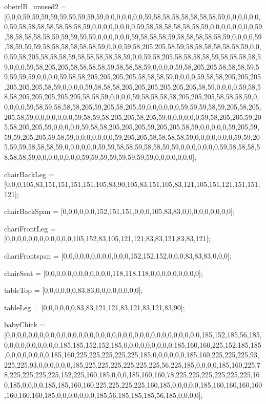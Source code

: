 obetrlB_unused2 = [0,0,0,59,59,59,59,59,59,59,59,59,0,0,0,0,0,0,0,59,58,58,58,58,58,58,58,59,0,0,0,0,0,0,0,59,58,58,58,58,58,58,58,59,0,0,0,0,0,0,0,0,59,58,58,58,58,58,58,59,0,0,0,0,0,0,0,0,59,58,58,58,58,58,59,59,59,59,59,0,0,0,0,0,0,59,58,58,58,59,58,58,58,58,58,59,0,0,0,0,59,58,59,59,59,58,58,58,58,58,58,59,0,0,0,59,58,205,205,58,59,58,58,58,58,58,58,59,0,0,0,59,58,205,58,58,58,59,58,58,58,58,58,59,0,0,59,58,205,58,58,58,58,59,58,58,58,58,59,0,0,0,59,58,205,205,58,58,58,58,59,58,58,58,59,0,0,0,0,59,58,205,205,58,58,58,59,59,59,59,59,0,0,0,0,59,58,58,205,205,205,205,58,58,58,59,0,0,0,0,59,58,58,205,205,205,205,205,205,58,59,0,0,0,0,59,58,58,58,205,205,205,205,205,205,58,59,0,0,0,0,59,58,58,58,205,205,205,205,205,58,58,59,0,0,0,0,59,58,58,58,58,205,205,205,58,58,58,59,0,0,0,0,0,59,58,59,58,58,58,205,59,205,58,205,59,0,0,0,0,0,0,59,59,59,58,59,205,58,205,205,58,59,0,0,0,0,0,0,0,59,58,59,58,205,205,58,205,59,0,0,0,0,0,0,59,58,205,205,59,205,58,205,205,59,0,0,0,0,0,59,58,58,205,205,205,59,205,205,58,59,0,0,0,0,0,59,205,59,59,59,205,205,59,58,59,0,0,0,0,0,0,0,59,205,205,58,58,58,58,59,0,0,0,0,0,0,0,59,59,205,59,59,58,58,58,59,0,0,0,0,0,0,59,59,58,58,59,58,58,59,59,0,0,0,0,0,0,0,59,58,58,58,58,58,58,59,0,0,0,0,0,0,0,0,59,59,59,59,59,59,59,59,0,0,0,0,0,0,0];

chairBackLeg = [0,0,0,105,83,151,151,151,151,105,83,90,105,83,151,105,83,121,105,151,121,151,151,121];

chairBackSpan = [0,0,0,0,0,0,152,151,151,0,0,0,105,83,83,0,0,0,0,0,0,0,0,0];

chariFrontLeg = [0,0,0,0,0,0,0,0,0,0,0,0,105,152,83,105,121,121,83,83,121,83,83,121];

chariFrontspan = [0,0,0,0,0,0,0,0,0,0,0,0,152,152,152,0,0,0,83,83,83,0,0,0];

chairSeat = [0,0,0,0,0,0,0,0,0,0,0,0,118,118,118,0,0,0,0,0,0,0,0,0];

tableTop = [0,0,0,0,0,0,83,83,0,0,0,0,0,0,0,0];

tableLeg = [0,0,0,0,0,0,83,83,121,121,83,121,83,121,83,90];

babyChick = [0,0,0,0,0,0,0,0,0,0,0,0,0,0,0,0,0,0,0,0,0,0,0,0,0,0,0,0,0,0,0,0,0,0,0,185,152,185,56,185,0,0,0,0,0,0,0,0,0,0,185,185,152,152,185,0,0,0,0,0,0,0,0,0,185,160,160,225,152,185,185,0,0,0,0,0,0,0,0,185,160,225,225,225,225,225,185,0,0,0,0,0,0,185,160,225,225,225,93,225,225,93,0,0,0,0,0,0,185,225,225,225,225,225,225,56,225,185,0,0,0,0,185,160,225,78,225,225,225,225,152,225,160,185,0,0,0,185,160,160,78,225,225,225,225,225,225,160,185,0,0,0,0,185,185,160,160,225,225,225,225,160,185,0,0,0,0,0,185,160,160,160,160,160,160,160,185,0,0,0,0,0,0,0,185,56,185,185,185,56,185,0,0,0,0];

